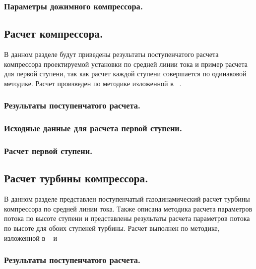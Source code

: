 \documentclass[a4paper,12pt]{article}
\begin{document}
    \subsubsection{Параметры дожимного компрессора.}


    \subsection{Расчет компрессора.}
    В данном разделе будут приведены результаты поступенчатого расчета компрессора проектируемой установки
    по средней линии тока и пример расчета для первой ступени, так как расчет каждой ступени совершается
    по одинаковой методике.
    Расчет произведен по методике изложенной в ~\cite{beknev_comp}.
    \subsubsection{Результаты поступенчатого расчета.}
    \subsubsection{Исходные данные для расчета первой ступени.}
    \subsubsection{Расчет первой ступени.}

    \subsection{Расчет турбины компрессора.}
    В данном разделе представлен поступенчатый газодинамический расчет турбины компрессора по средней линии тока.
    Также описана методика расчета параметров потока по высоте ступени и представлены результаты расчета параметров
    потока по высоте для обоих ступеней турбины.
    Расчет выполнен по методике, изложенной в ~\cite{molyakov1} и ~\cite{molyakov2}
    \subsubsection{Результаты поступенчатого расчета.}
\end{document}
